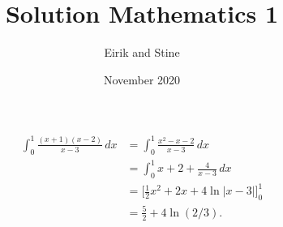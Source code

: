\documentclass{article}
\title{Solution Mathematics 1}
\author{Eirik and Stine}
\date{November 2020}
\begin{document}
\maketitle
\begin{align*}
    \int_0^1\frac{(x+1)(x-2)}{x-3}\,dx&=\int_0^1\frac{x^2-x-2}{x-3}\,dx\\
    &=\int_0^1x+2+\frac{4}{x-3}\,dx\\
    &=\bigg[\frac{1}{2}x^2+2x+4\ln|x-3|\bigg]_0^1\\
    &=\frac{5}{2}+4\ln(2/3).
\end{align*}
\end{document}
